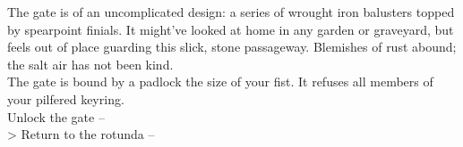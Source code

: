 The gate is of an uncomplicated design: a series of wrought iron balusters topped by spearpoint finials. It might've looked at home in any garden or graveyard, but feels out of place guarding this slick, stone passageway. Blemishes of rust abound; the salt air has not been kind.\\

The gate is bound by a padlock the size of your fist. It refuses all members of your pilfered keyring.\\

 Unlock the gate -- \\
> Return to the rotunda -- 